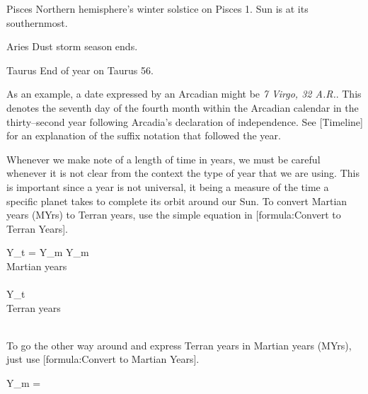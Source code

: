 {    \bTR
      \bTC Pisces \eTC
      \bTC \math{[270^{\circ}, 300^{\circ})} \eTC
       \eTC
       \eTC
      \bTC Northern hemisphere's winter solstice on Pisces 1. Sun is at its southernmost. \eTC
    \eTR
    
    \bTR
      \bTC Aries \eTC
      \bTC \math{[300^{\circ}, 330^{\circ})} \eTC
       \eTC
       \eTC
      \bTC Dust storm season ends. \eTC
    \eTR

    \bTR
      \bTC Taurus \eTC
      \bTC \math{[330^{\circ}, 360^{\circ})} \eTC
       \eTC
       \eTC
      \bTC End of year on Taurus 56. \eTC
    \eTR 
\eTABLEbody

\eTABLE
}

As an example, a date expressed by an Arcadian might be {\it 7 Virgo, 32 A.R.}. This denotes the seventh day of the fourth month within the Arcadian calendar in the thirty--second year following Arcadia's declaration of independence. See [Timeline] for an explanation of the suffix notation that followed the year.


Whenever we make note of a length of time in years, we must be careful whenever it is not clear from the context the type of year that we are using. This is important since a year is not universal, it being a measure of the time a specific planet takes to complete its orbit around our Sun. To convert Martian years (MYrs) to Terran years, use the simple equation in [formula:Convert to Terran Years].

\startformula
Y_t = Y_m 
\stopformula
\startlegend
\leg Y_m \\ Martian years\\ \\
\leg Y_t \\ Terran years \\ \\
\stoplegend
\crlf

To go the other way around and express Terran years in Martian years (MYrs), just use [formula:Convert to Martian Years].

\startformula
Y_m = 
\stopformula
\crlf

